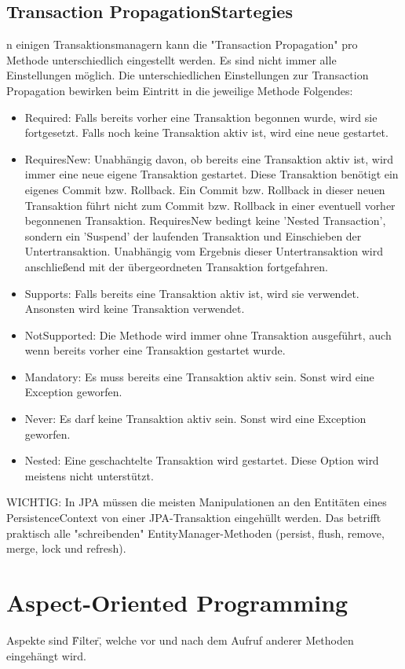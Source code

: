 \documentclass[10pt]{scrartcl}
\begin{document}
\subsection{Transaction PropagationStartegies}
n einigen Transaktionsmanagern kann die "Transaction Propagation" pro Methode unterschiedlich eingestellt werden. Es sind nicht immer alle Einstellungen möglich. Die unterschiedlichen Einstellungen zur Transaction Propagation bewirken beim Eintritt in die jeweilige Methode Folgendes:

\begin{itemize}
	\item Required: Falls bereits vorher eine Transaktion begonnen wurde, wird sie fortgesetzt. Falls noch keine Transaktion aktiv ist, wird eine neue gestartet.
	\item RequiresNew: Unabhängig davon, ob bereits eine Transaktion aktiv ist, wird immer eine neue eigene Transaktion gestartet. Diese Transaktion benötigt ein eigenes Commit bzw. Rollback. Ein Commit bzw. Rollback in dieser neuen Transaktion führt nicht zum Commit bzw. Rollback in einer eventuell vorher begonnenen Transaktion. RequiresNew bedingt keine 'Nested Transaction', sondern ein 'Suspend' der laufenden Transaktion und Einschieben der Untertransaktion. Unabhängig vom Ergebnis dieser Untertransaktion wird anschließend mit der übergeordneten Transaktion fortgefahren.
	\item Supports: Falls bereits eine Transaktion aktiv ist, wird sie verwendet. Ansonsten wird keine Transaktion verwendet.
	\item NotSupported: Die Methode wird immer ohne Transaktion ausgeführt, auch wenn bereits vorher eine Transaktion gestartet wurde.
	\item Mandatory: Es muss bereits eine Transaktion aktiv sein. Sonst wird eine Exception geworfen.
	\item Never: Es darf keine Transaktion aktiv sein. Sonst wird eine Exception geworfen.
	\item Nested: Eine geschachtelte Transaktion wird gestartet. Diese Option wird meistens nicht unterstützt.
\end{itemize}

WICHTIG: In JPA müssen die meisten Manipulationen an den Entitäten eines PersistenceContext von einer JPA-Transaktion eingehüllt werden. Das betrifft praktisch alle "schreibenden" EntityManager-Methoden (persist, flush, remove, merge, lock und refresh).


\newpage
\section{Aspect-Oriented Programming}
Aspekte sind \"Filter\", welche vor und nach dem Aufruf anderer Methoden eingehängt wird.
\end{document}

